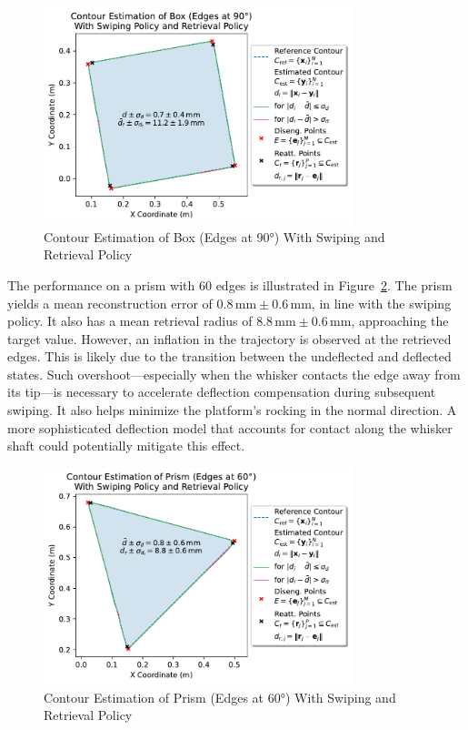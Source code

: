 \begin{figure}[!htb]
    \centering
    \includegraphics[width=0.8\textwidth]{figures/experiments/box-edges-90deg-swiping-retrieval}
    \caption{Contour Estimation of Box (Edges at 90°) With Swiping and Retrieval Policy}
    \label{fig:experiment-box-edges-90deg-swiping-retrieval}
\end{figure}

The performance on a prism with 60\degree{} edges is illustrated in Figure~\ref{fig:experiment-prism-edges-60deg-swiping-retrieval}.
The prism yields a mean reconstruction error of $0.8\,\text{mm} \pm 0.6\,\text{mm}$, in line with the swiping policy.
It also has a mean retrieval radius of $8.8\,\text{mm} \pm 0.6\,\text{mm}$, approaching the target value.
However, an inflation in the trajectory is observed at the retrieved edges.
This is likely due to the transition between the undeflected and deflected states.
Such overshoot—especially when the whisker contacts the edge away from its tip—is necessary to accelerate deflection compensation during subsequent swiping.
It also helps minimize the platform’s rocking in the normal direction.
A more sophisticated deflection model that accounts for contact along the whisker shaft could potentially mitigate this effect.

\begin{figure}[!htb]
    \centering
    \includegraphics[width=0.8\textwidth]{figures/experiments/prism-edges-60deg-swiping-retrieval}
    \caption{Contour Estimation of Prism (Edges at 60°) With Swiping and Retrieval Policy}
    \label{fig:experiment-prism-edges-60deg-swiping-retrieval}
\end{figure}

